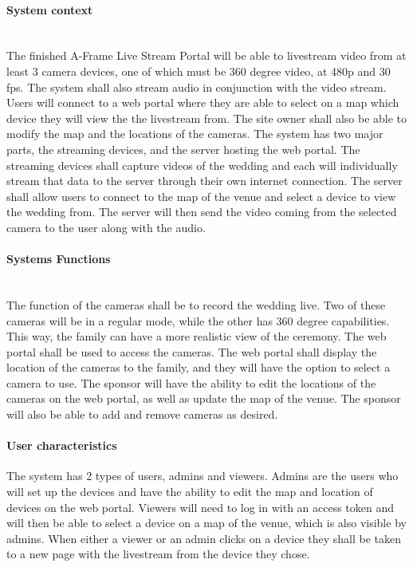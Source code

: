 \documentclass[onecolumn, draftclsnofoot,10pt, compsoc]{IEEEtran}
\begin{document}
    \paragraph{System context} \\
        The finished A-Frame Live Stream Portal will be able to livestream video from at least 3 camera devices, one of which must be 360 degree video, at 480p and 30 fps. 
        The system shall also stream audio in conjunction with the video stream. 
        Users will connect to a web portal where they are able to select on a map which device they will view the the livestream from. 
        The site owner shall also be able to modify the map and the locations of the cameras.
        The system has two major parts, the streaming devices, and the server hosting the web portal. 
        The streaming devices shall capture videos of the wedding and each will individually stream that data to the server through their own internet connection. 
        The server shall allow users to connect to the map of the venue and select a device to view the wedding from. 
        The server will then send the video coming from the selected camera to the user along with the audio.
        \\
        \paragraph{Systems Functions}\\
        The function of the cameras shall be to record the wedding live. 
        Two of these cameras will be in a regular mode, while the other has 360 degree capabilities. 
        This way, the family can have a more realistic view of the ceremony.
        The web portal shall be used to access the cameras. 
        The web portal shall display the location of the cameras to the family, and they will have the option to select a camera to use. 
        The sponsor will have the ability to edit the locations of the cameras on the web portal, as well as update the map of the venue. The sponsor will also be able to add and remove cameras as desired.
    \\
        \paragraph{User characteristics}
        The system has 2 types of users, admins and viewers. 
        Admins are the users who will set up the devices and have the ability to edit the map and location of devices on the web portal.
        Viewers will need to log in with an access token and will then be able to select a device on a map of the venue, which is also visible by admins. 
        When either a viewer or an admin clicks on a device they shall be taken to a new page with the livestream from the device they chose.
\end{document}
